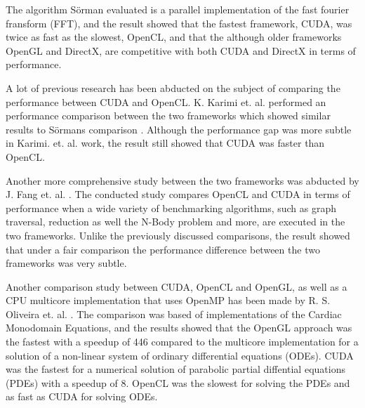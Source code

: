The algorithm Sörman evaluated is a parallel implementation of the fast fourier fransform (FFT), and the result showed that the fastest framework, CUDA, was twice as fast as the slowest, OpenCL, and that the although older frameworks OpenGL and DirectX, are competitive with both CUDA and DirectX in terms of performance.

A lot of previous research has been abducted on the subject of comparing the performance between CUDA and OpenCL. K. Karimi et. al. performed an performance comparison between the two frameworks which showed similar results to Sörmans comparison \cite{karimi2010performance}. Although the performance gap was more subtle in Karimi. et. al. work, the result still showed that CUDA was faster than OpenCL. 

Another more comprehensive study between the two frameworks was abducted by J. Fang et. al. \cite{fang2011comprehensive}. The conducted study compares OpenCL and CUDA in terms of performance when a wide variety of benchmarking algorithms, such as graph traversal, reduction as well the N-Body problem and more, are executed in the two frameworks. Unlike the previously discussed comparisons, the result showed that under a fair comparison the performance difference between the two frameworks was very subtle. 

Another comparison study between CUDA, OpenCL and OpenGL, as well as a CPU multicore implementation that uses OpenMP has been made by R. S. Oliveira et. al. \cite{oliveira2011comparing}. The comparison was based of implementations of the Cardiac Monodomain Equations, and the results showed that the OpenGL approach was the fastest with a speedup of 446 compared to the multicore implementation for a solution of a non-linear system of ordinary differential equations (ODEs). CUDA was the fastest for a numerical solution of parabolic partial diffential equations (PDEs) with a speedup of 8. OpenCL was the slowest for solving the PDEs and as fast as CUDA for solving ODEs.


